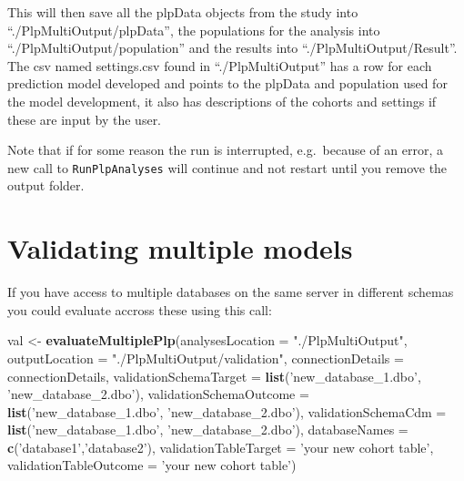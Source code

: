 \documentclass[]{article}
\newenvironment{Shaded}{\begin{snugshade}}{\end{snugshade}}
\newcommand{\KeywordTok}[1]{\textcolor[rgb]{0.13,0.29,0.53}{\textbf{#1}}}
\newcommand{\DataTypeTok}[1]{\textcolor[rgb]{0.13,0.29,0.53}{#1}}
\newcommand{\StringTok}[1]{\textcolor[rgb]{0.31,0.60,0.02}{#1}}
\newcommand{\NormalTok}[1]{#1}
\begin{document}
This will then save all the plpData objects from the study into
``./PlpMultiOutput/plpData'', the populations for the analysis into
``./PlpMultiOutput/population'' and the results into
``./PlpMultiOutput/Result''. The csv named settings.csv found in
``./PlpMultiOutput'' has a row for each prediction model developed and
points to the plpData and population used for the model development, it
also has descriptions of the cohorts and settings if these are input by
the user.

Note that if for some reason the run is interrupted, e.g.~because of an
error, a new call to \texttt{RunPlpAnalyses} will continue and not
restart until you remove the output folder.

\section{Validating multiple models}\label{validating-multiple-models}

If you have access to multiple databases on the same server in different
schemas you could evaluate accross these using this call:

\begin{Shaded}
\begin{Highlighting}[]
\NormalTok{val <-}\StringTok{ }\KeywordTok{evaluateMultiplePlp}\NormalTok{(}\DataTypeTok{analysesLocation =} \StringTok{"./PlpMultiOutput"}\NormalTok{,}
                           \DataTypeTok{outputLocation =} \StringTok{"./PlpMultiOutput/validation"}\NormalTok{,}
                           \DataTypeTok{connectionDetails =}\NormalTok{ connectionDetails, }
                           \DataTypeTok{validationSchemaTarget =} \KeywordTok{list}\NormalTok{(}\StringTok{'new_database_1.dbo'}\NormalTok{,}
                                                              \StringTok{'new_database_2.dbo'}\NormalTok{),}
                           \DataTypeTok{validationSchemaOutcome =} \KeywordTok{list}\NormalTok{(}\StringTok{'new_database_1.dbo'}\NormalTok{,}
                                                              \StringTok{'new_database_2.dbo'}\NormalTok{),}
                           \DataTypeTok{validationSchemaCdm =} \KeywordTok{list}\NormalTok{(}\StringTok{'new_database_1.dbo'}\NormalTok{,}
                                                              \StringTok{'new_database_2.dbo'}\NormalTok{), }
                           \DataTypeTok{databaseNames =} \KeywordTok{c}\NormalTok{(}\StringTok{'database1'}\NormalTok{,}\StringTok{'database2'}\NormalTok{),}
                           \DataTypeTok{validationTableTarget =} \StringTok{'your new cohort table'}\NormalTok{,}
                           \DataTypeTok{validationTableOutcome =} \StringTok{'your new cohort table'}\NormalTok{)}
\end{Highlighting}
\end{Shaded}
\end{document}
